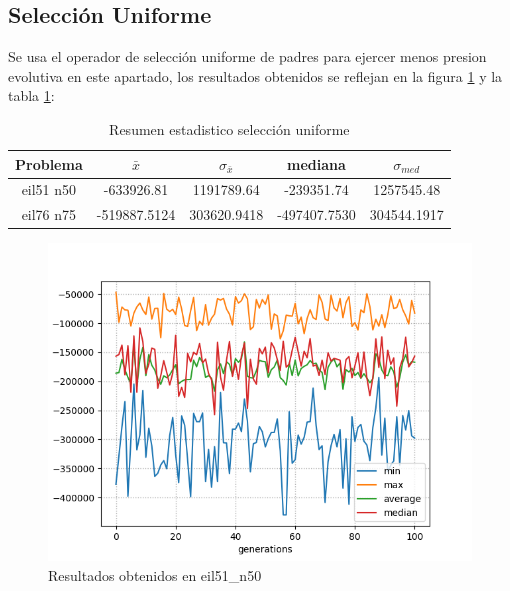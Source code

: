 \documentclass[twocolumn]{IEEEtran}
\begin{document}
\subsection{Selección Uniforme}
Se usa el operador de selección uniforme de padres para ejercer menos presion evolutiva
en este apartado, los resultados obtenidos se reflejan en la figura \ref{figure:51_random}
y la tabla \ref{table:results_rand}:

\begin{table}[htpb]
    \centering
    \begin{tabular}{|c|c|c|c|c|}
        \hline
        Problema & $\bar{x}$ & $\sigma_{\bar{x}}$ & mediana & $\sigma_{med}$ \\
        \hline
        eil51 n50 & -633926.81 & 1191789.64 & -239351.74 & 1257545.48 \\
        \hline
        eil76 n75 & -519887.5124 & 303620.9418 & -497407.7530 & 304544.1917 \\
        \hline
    \end{tabular}
    \caption{Resumen estadistico selección uniforme}
    \label{table:results_rand}
\end{table}

\begin{figure}[htbp!]
    \centering
    \includegraphics[width=\linewidth]{figures/TTP_eil51_n50_random.png}
    \caption{Resultados obtenidos en eil51\_n50}
    \label{figure:51_random}
\end{figure}
\end{document}
